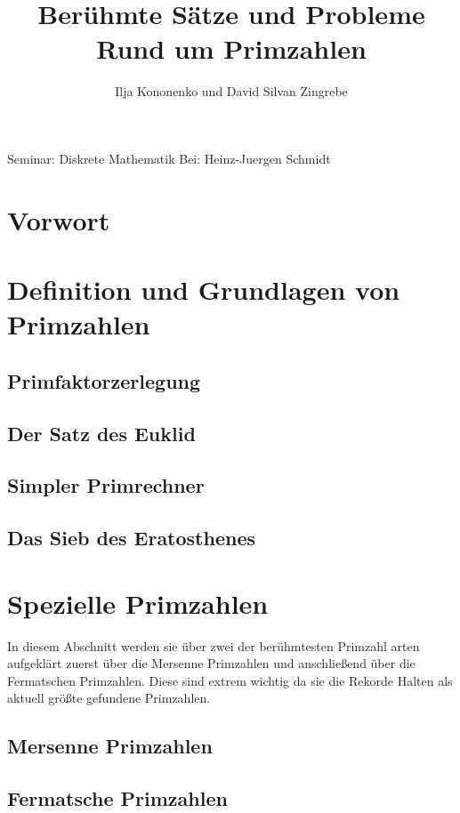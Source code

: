 \documentclass[11pt]{article}
\begin{document}
\begin{titlepage}
\title{Berühmte Sätze und Probleme Rund um Primzahlen}
\author{Ilja Kononenko und David Silvan Zingrebe}
\maketitle
Seminar: Diskrete Mathematik
Bei: Heinz-Juergen Schmidt
\end{titlepage}
\tableofcontents
\newpage
\section*{Vorwort}

\newpage
\section{Definition und Grundlagen von Primzahlen}

\subsection{Primfaktorzerlegung}

\newpage
\subsection{Der Satz des Euklid}

\newpage
\subsection{Simpler Primrechner}

\newpage
\subsection{Das Sieb des Eratosthenes}

\newpage
\section{Spezielle Primzahlen}
In diesem Abschnitt werden sie über zwei der berühmtesten Primzahl arten aufgeklärt zuerst über die Mersenne Primzahlen und anschließend über die Fermatschen Primzahlen. Diese sind extrem wichtig da sie die Rekorde Halten als aktuell größte gefundene Primzahlen.
\subsection{Mersenne Primzahlen}

\newpage
\subsection{Fermatsche Primzahlen}

\newpage
\end{document}
